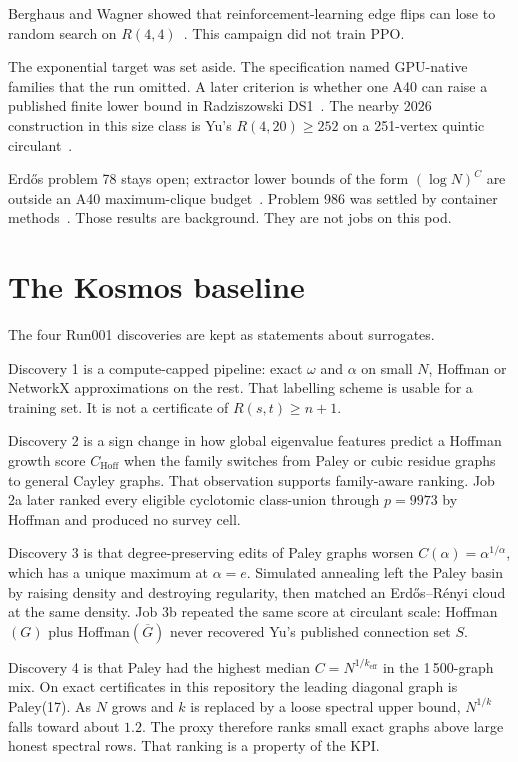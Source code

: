 \documentclass[11pt,a4paper]{article}
\begin{document}
Berghaus and Wagner showed that reinforcement-learning edge flips can
lose to random search on $R(4,4)$~\cite{berghaus}. This campaign did
not train PPO.

The exponential target was set aside. The specification named
GPU-native families that the run omitted. A later criterion is whether
one A40 can raise a published finite lower bound in Radziszowski
DS1~\cite{ds1}. The nearby 2026 construction in this size class is Yu's
$R(4,20)\ge 252$ on a 251-vertex quintic circulant~\cite{yu}.

Erd\H{o}s problem 78 stays open; extractor lower bounds of the form
$(\log N)^C$ are outside an A40 maximum-clique budget~\cite{li2023}.
Problem 986 was settled by container methods~\cite{bradac}. Those
results are background. They are not jobs on this pod.

\section{The Kosmos baseline}

The four Run001 discoveries are kept as statements about surrogates.

Discovery 1 is a compute-capped pipeline: exact $\omega$ and $\alpha$
on small $N$, Hoffman or NetworkX approximations on the rest. That
labelling scheme is usable for a training set. It is not a certificate
of $R(s,t)\ge n+1$.

Discovery 2 is a sign change in how global eigenvalue features predict
a Hoffman growth score $C_{\mathrm{Hoff}}$ when the family switches
from Paley or cubic residue graphs to general Cayley graphs. That
observation supports family-aware ranking. Job 2a later ranked every
eligible cyclotomic class-union through $p=9973$ by Hoffman and produced
no survey cell.

Discovery 3 is that degree-preserving edits of Paley graphs worsen
$C(\alpha)=\alpha^{1/\alpha}$, which has a unique maximum at
$\alpha=e$. Simulated annealing left the Paley basin by raising density
and destroying regularity, then matched an Erd\H{o}s--R\'enyi cloud at
the same density. Job 3b repeated the same score at circulant scale:
Hoffman$(G)$ plus Hoffman$(\overline{G})$ never recovered Yu's published
connection set $S$.

Discovery 4 is that Paley had the highest median $C=N^{1/k_{\mathrm{eff}}}$
in the 1\,500-graph mix. On exact certificates in this repository the
leading diagonal graph is Paley(17). As $N$ grows and $k$ is replaced by
a loose spectral upper bound, $N^{1/k}$ falls toward about $1.2$. The
proxy therefore ranks small exact graphs above large honest spectral
rows. That ranking is a property of the KPI.
\end{document}
